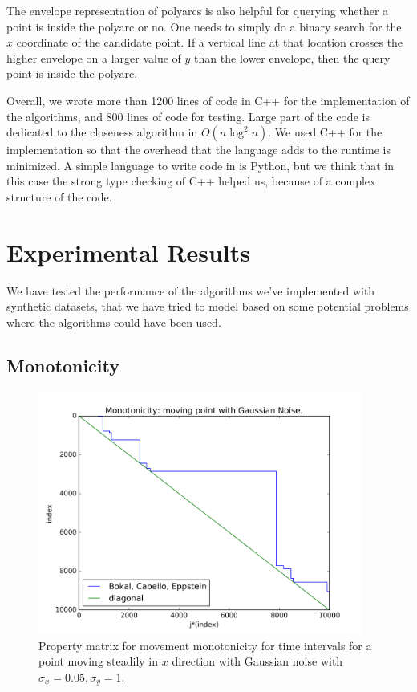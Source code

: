 \documentclass{article}
\begin{document}
The envelope representation of polyarcs is also helpful for querying whether a point is inside the polyarc or no. One needs to simply do a binary search for the $x$ coordinate of the candidate point.
If a vertical line at that location crosses the higher envelope on a larger value of $y$ than the lower envelope, then the query point is inside the polyarc.

Overall, we wrote more than 1200 lines of code in C++ for the implementation of the algorithms, and 800 lines of code for testing. Large part of the code is dedicated to the closeness algorithm in $O(n \log^2 n)$. We used C++ for the implementation so that the overhead that the language adds to the runtime is minimized. A simple language to write code in is Python, but we think that in this case the strong type checking of C++ helped us, because of a complex structure of the code. 

\section{Experimental Results}
\label{sec:experiments}
We have tested the performance of the algorithms we've implemented with synthetic datasets, that we have tried to model based on some potential problems where the algorithms could have been used.

\subsection{Monotonicity}

\begin{figure}[!ht]
  \centering
  \includegraphics[height=8cm]{../plots/monotonicity_moving_gaussian}
  \caption{Property matrix for movement monotonicity for time intervals for a point moving steadily in $x$ direction with Gaussian noise with $\sigma_x = 0.05, \sigma_y = 1$.}
  \label{fig:monotonicity_demo}
\end{figure}
\end{document}

